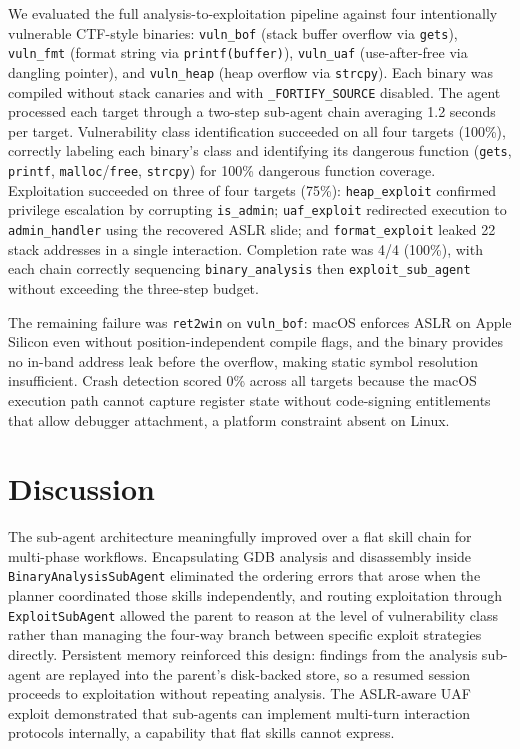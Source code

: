 \documentclass[conference]{IEEEtran}
\begin{document}
We evaluated the full analysis-to-exploitation pipeline against four intentionally vulnerable CTF-style binaries: \texttt{vuln\_bof} (stack buffer overflow via \texttt{gets}), \texttt{vuln\_fmt} (format string via \texttt{printf(buffer)}), \texttt{vuln\_uaf} (use-after-free via dangling pointer), and \texttt{vuln\_heap} (heap overflow via \texttt{strcpy}). Each binary was compiled without stack canaries and with \texttt{\_FORTIFY\_SOURCE} disabled. The agent processed each target through a two-step sub-agent chain averaging 1.2 seconds per target. Vulnerability class identification succeeded on all four targets (100\%), correctly labeling each binary's class and identifying its dangerous function (\texttt{gets}, \texttt{printf}, \texttt{malloc}/\texttt{free}, \texttt{strcpy}) for 100\% dangerous function coverage. Exploitation succeeded on three of four targets (75\%): \texttt{heap\_exploit} confirmed privilege escalation by corrupting \texttt{is\_admin}; \texttt{uaf\_exploit} redirected execution to \texttt{admin\_handler} using the recovered ASLR slide; and \texttt{format\_exploit} leaked 22 stack addresses in a single interaction. Completion rate was 4/4 (100\%), with each chain correctly sequencing \texttt{binary\_analysis} then \texttt{exploit\_sub\_agent} without exceeding the three-step budget.

The remaining failure was \texttt{ret2win} on \texttt{vuln\_bof}: macOS enforces ASLR on Apple Silicon even without position-independent compile flags, and the binary provides no in-band address leak before the overflow, making static symbol resolution insufficient. Crash detection scored 0\% across all targets because the macOS execution path cannot capture register state without code-signing entitlements that allow debugger attachment, a platform constraint absent on Linux.

\section{Discussion}

The sub-agent architecture meaningfully improved over a flat skill chain for multi-phase workflows. Encapsulating GDB analysis and disassembly inside \texttt{BinaryAnalysisSubAgent} eliminated the ordering errors that arose when the planner coordinated those skills independently, and routing exploitation through \texttt{ExploitSubAgent} allowed the parent to reason at the level of vulnerability class rather than managing the four-way branch between specific exploit strategies directly. Persistent memory reinforced this design: findings from the analysis sub-agent are replayed into the parent's disk-backed store, so a resumed session proceeds to exploitation without repeating analysis. The ASLR-aware UAF exploit demonstrated that sub-agents can implement multi-turn interaction protocols internally, a capability that flat skills cannot express.
\end{document}
